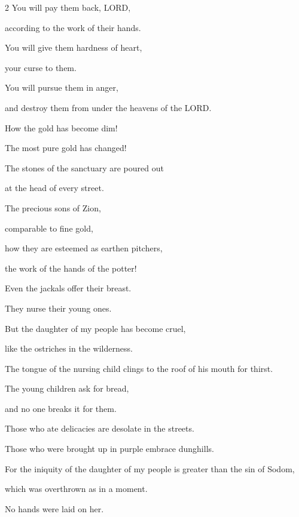 \begin{multicols}{2}
	\myverse{}You will pay them back, LORD,
	
	according to the work of their hands.
	
	\myverse{}You will give them hardness of heart,
	
	your curse to them.
	
	\myverse{}You will pursue them in anger,
	
	and destroy them from under the heavens of the LORD.
	
	\mychapter{} \myverse*{}How the gold has become dim!
	
	The most pure gold has changed!
	
	The stones of the sanctuary are poured out
	
	at the head of every street.
	\vspace{\baselineskip}
	
	\myverse{}The precious sons of Zion,
	
	comparable to fine gold,
	
	how they are esteemed as earthen pitchers,
	
	the work of the hands of the potter!
	\vspace{\baselineskip}
	
	\myverse{}Even the jackals offer their breast.
	
	They nurse their young ones.
	
	But the daughter of my people has become cruel,
	
	like the ostriches in the wilderness.
	\vspace{\baselineskip}
	
	\myverse{}The tongue of the nursing child clings to the roof of his mouth
	for thirst.
	
	The young children ask for bread,
	
	and no one breaks it for them.
	\vspace{\baselineskip}
	
	\myverse{}Those who ate delicacies are desolate in the streets.
	
	Those who were brought up in purple embrace dunghills.
	\vspace{\baselineskip}
	
	\myverse{}For the iniquity of the daughter of my people is greater than
	the sin of Sodom,
	
	which was overthrown as in a moment.
	
	No hands were laid on her.
	\vspace{\baselineskip}
	

\end{multicols}
